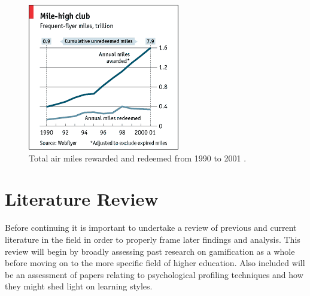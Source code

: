 \documentclass[12pt,a4paper,twoside]{report}
\begin{document}
\begin{figure}
\begin{center}
	\includegraphics{../img/flyer.png}
	\caption{Total air miles rewarded and redeemed from 1990 to 2001 \cite{freq-fly}.}
	\label{freq-flyer}
\end{center}
\end{figure}

\chapter{Literature Review}
\label{sec:lit}
Before continuing it is important to undertake a review of previous and current literature in the field in order to properly frame later findings and analysis. This review will begin by broadly assessing past research on gamification as a whole before moving on to the more specific field of higher education. Also included will be an assessment of papers relating to psychological profiling techniques and how they might shed light on learning styles.
\end{document}
